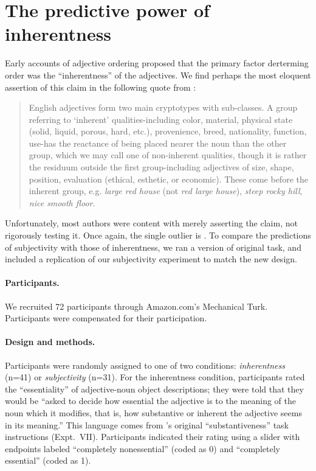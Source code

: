 \documentclass[12pt]{article}
\begin{document}
\section{The predictive power of inherentness}

Early accounts of adjective ordering proposed that the primary factor derterming order was the ``inherentness'' of the adjectives. We find perhaps the most eloquent assertion of this claim in the following quote from \cite{whorf1945}: 

\begin{quotation}
English adjectives form two main cryptotypes with sub-classes. A group referring to `inherent' qualities-including color, material, physical state (solid, liquid, porous, hard, etc.), provenience, breed, nationality, function, use-has the reactance of being placed nearer the noun than the other group, which we may call one of non-inherent qualities, though it is rather the residuum outside the first group-including adjectives of size, shape, position, evaluation (ethical, esthetic, or economic). These come before the inherent group, e.g. \emph{large red house} (not \emph{red large house}), \emph{steep rocky hill}, \emph{nice smooth floor}.
\end{quotation}

Unfortunately, most authors were content with merely asserting the claim, not rigorously testing it. Once again, the single outlier is \cite{martin1969}. To compare the predictions of subjectivity with those of inherentness, we ran a version of \cite{martin1969} original task, and included a replication of our subjectivity experiment to match the new design.

\paragraph{Participants.} We recruited 72 participants through Amazon.com's Mechanical Turk. Participants were compensated for their participation.

\paragraph{Design and methods.} Participants were randomly assigned to one of two conditions: \emph{inherentness} (n=41) or \emph{subjectivity} (n=31). For the inherentness condition, participants rated the ``essentiality'' of adjective-noun object descriptions; they were told that they would be ``asked to decide how essential the adjective is to the meaning of the noun which it modifies, that is, how substantive or inherent the adjective seems in its meaning.'' This language comes from \citeauthor{martin1969}'s original ``substantiveness'' task instructions (Expt.~VII). Participants indicated their rating using a slider with endpoints labeled ``completely nonessential'' (coded as 0) and ``completely essential'' (coded as 1).
\end{document}
